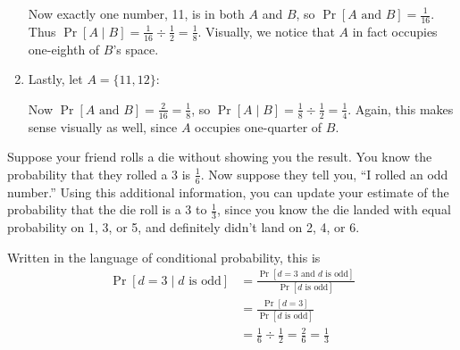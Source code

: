 \begin{example}
\begin{enumerate}
            Now exactly one number, 11, is in both $A$ and $B$, so $\Pr[A \text{ and } 
            B] = \frac{1}{16}$. Thus $\Pr[A \mid B] = \frac{1}{16} \div \frac{1}{2}
            = \frac{1}{8}$. Visually, we notice that $A$ in fact occupies one-eighth
            of $B$'s space.

        \item Lastly, let $A = \{11,12\}$:
            \begin{center}
            \end{center}

            Now $\Pr[A \text{ and } B] = \frac{2}{16} = \frac{1}{8}$, so $\Pr[A \mid B]
            = \frac{1}{8} \div \frac{1}{2} = \frac{1}{4}$. Again, this makes 
            sense visually as well, since $A$ occupies one-quarter of $B$.
    \end{enumerate}
\end{example}

\begin{example}
    Suppose your friend rolls a die without showing you the result.
    You know the probability that they rolled a 3 is $\frac{1}{6}$. Now 
    suppose they tell you, ``I rolled an odd number.'' Using this additional 
    information, you can update your estimate of the probability that the 
    die roll is a 3 to $\frac{1}{3}$, since you know the die landed with 
    equal probability on 1, 3, or 5, and definitely didn't land on 2, 4, 
    or 6.

    Written in the language of conditional probability, this is
    \begin{align*}
        \Pr[d = 3 \mid d \text{ is odd}] 
        &= \frac{
                \Pr[d=3 \text{ and } d \text{ is odd}]
            }{
                \Pr[d \text{ is odd}]
            }\\
        &= \frac{
                \Pr[d=3]
            }{
                \Pr[d \text{ is odd}]
            }\\
        &= \frac{1}{6} \div \frac{1}{2} = \frac{2}{6} = \frac{1}{3}
    \end{align*}
\end{example}

